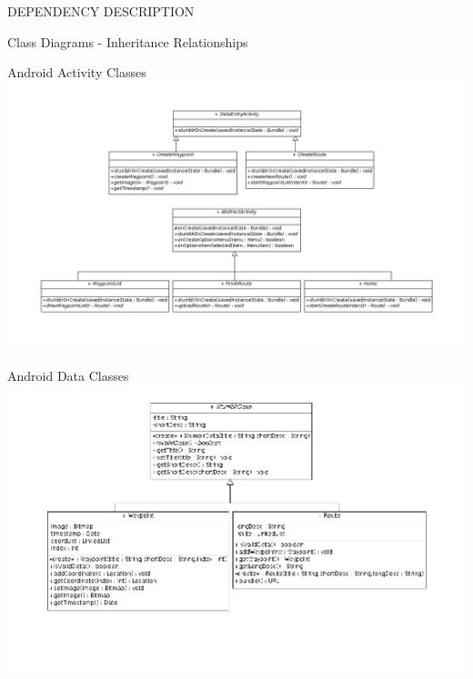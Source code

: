 \documentclass{article}
\begin{document}
\begin{section}{DEPENDENCY DESCRIPTION}
	\begin{subsection}{Class Diagrams - Inheritance Relationships}
		\begin{subsubsection}{Android Activity Classes}
			\includegraphics[angle=270,width=0.75\columnwidth]{../ClassDiagrams/InterfaceClassDiagram.png}
		\end{subsubsection}
		
		\clearpage
		\begin{subsubsection}{Android Data Classes}
			\includegraphics[angle=270,width=0.8\columnwidth]{../ClassDiagrams/DataStructuresClassDiagram.png}
		\end{subsubsection}
	\end{subsection}
\end{section}
\end{document}
